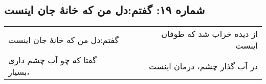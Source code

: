 \begin{center}
\section*{شماره ۱۹: گفتم:‌دل من که خانۀ جان اینست}
\label{sec:019}
\begin{longtable}{l p{0.5cm} r}
گفتم:‌دل من که خانهٔ جان اینست
&&
از دیده خراب شد که طوفان اینست
\\
گفتا که چو آب چشم داری بسیار،
&&
در آب گذار چشم، درمان اینست
\\
\end{longtable}
\end{center}
